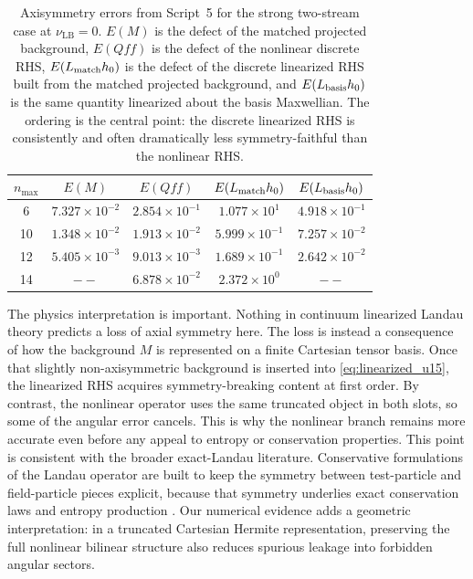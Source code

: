 \documentclass[11pt]{article}
\begin{document}
\begin{table}[H]
    \centering
    \caption{Axisymmetry errors from Script~5 for the strong two-stream case at $\nu_{\mathrm{LB}}=0$.
    $E(M)$ is the defect of the matched projected background, $E(Qff)$ is the defect of the nonlinear discrete RHS, $E(L_{\rm match}h_0)$ is the defect of the discrete linearized RHS built from the matched projected background, and $E(L_{\rm basis}h_0)$ is the same quantity linearized about the basis Maxwellian.
    The ordering is the central point: the discrete linearized RHS is consistently and often dramatically less symmetry-faithful than the nonlinear RHS.}
    \label{tab:symbreak_source_u15}
    \begin{tabular}{@{}ccccc@{}}
    \toprule
    $n_{\max}$ & $E(M)$ & $E(Qff)$ & $E(L_{\rm match}h_0)$ & $E(L_{\rm basis}h_0)$ \\
    \midrule
    6  & $7.327\times10^{-2}$ & $2.854\times10^{-1}$ & $1.077\times10^{1}$ & $4.918\times10^{-1}$ \\
    10 & $1.348\times10^{-2}$ & $1.913\times10^{-2}$ & $5.999\times10^{-1}$ & $7.257\times10^{-2}$ \\
    12 & $5.405\times10^{-3}$ & $9.013\times10^{-3}$ & $1.689\times10^{-1}$ & $2.642\times10^{-2}$ \\
    14 & $--$ & $6.878\times10^{-2}$ & $2.372\times10^{0}$ & $--$ \\
    \bottomrule
    \end{tabular}
\end{table}

The physics interpretation is important.
Nothing in continuum linearized Landau theory predicts a loss of axial symmetry here.
The loss is instead a consequence of how the background $M$ is represented on a finite Cartesian tensor basis.
Once that slightly non-axisymmetric background is inserted into \cref{eq:linearized_u15}, the linearized RHS acquires symmetry-breaking content at first order.
By contrast, the nonlinear operator uses the same truncated object in both slots, so some of the angular error cancels.
This is why the nonlinear branch remains more accurate even before any appeal to entropy or conservation properties.
This point is consistent with the broader exact-Landau literature.
Conservative formulations of the Landau operator are built to keep the symmetry between test-particle and field-particle pieces explicit, because that symmetry underlies exact conservation laws and entropy production \cite{pan2020exact,hirvijoki2022metriplectic}.
Our numerical evidence adds a geometric interpretation: in a truncated Cartesian Hermite representation, preserving the full nonlinear bilinear structure also reduces spurious leakage into forbidden angular sectors.
\end{document}
